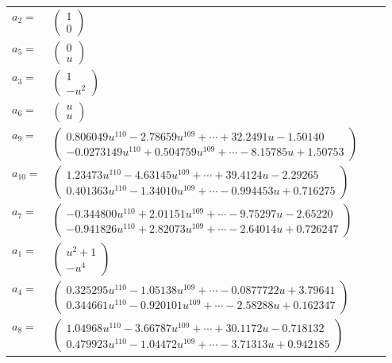 \documentclass[1p]{elsarticle_modified}
\theoremstyle{definition}
\begin{document}
\begin{tabular}{m{7pt} m{180pt} m{7pt} m{180pt} }
\flushright $a_{2}=$&$\begin{pmatrix}1\\0\end{pmatrix}$ \\
\flushright $a_{5}=$&$\begin{pmatrix}0\\u\end{pmatrix}$ \\
\flushright $a_{3}=$&$\begin{pmatrix}1\\- u^2\end{pmatrix}$ \\
\flushright $a_{6}=$&$\begin{pmatrix}u\\u\end{pmatrix}$ \\
\flushright $a_{9}=$&$\begin{pmatrix}0.806049 u^{110}-2.78659 u^{109}+\cdots+32.2491 u-1.50140\\-0.0273149 u^{110}+0.504759 u^{109}+\cdots-8.15785 u+1.50753\end{pmatrix}$ \\
\flushright $a_{10}=$&$\begin{pmatrix}1.23473 u^{110}-4.63145 u^{109}+\cdots+39.4124 u-2.29265\\0.401363 u^{110}-1.34010 u^{109}+\cdots-0.994453 u+0.716275\end{pmatrix}$ \\
\flushright $a_{7}=$&$\begin{pmatrix}-0.344800 u^{110}+2.01151 u^{109}+\cdots-9.75297 u-2.65220\\-0.941826 u^{110}+2.82073 u^{109}+\cdots-2.64014 u+0.726247\end{pmatrix}$ \\
\flushright $a_{1}=$&$\begin{pmatrix}u^2+1\\- u^4\end{pmatrix}$ \\
\flushright $a_{4}=$&$\begin{pmatrix}0.325295 u^{110}-1.05138 u^{109}+\cdots-0.0877722 u+3.79641\\0.344661 u^{110}-0.920101 u^{109}+\cdots-2.58288 u+0.162347\end{pmatrix}$ \\
\flushright $a_{8}=$&$\begin{pmatrix}1.04968 u^{110}-3.66787 u^{109}+\cdots+30.1172 u-0.718132\\0.479923 u^{110}-1.04472 u^{109}+\cdots-3.71313 u+0.942185\end{pmatrix}$ \\

\end{tabular}
\end{document}
